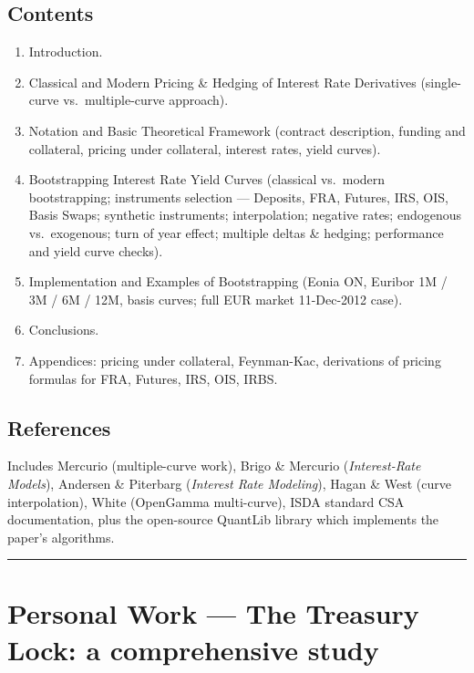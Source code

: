 \documentclass[11pt,a4paper]{article}
\begin{document}
\subsection*{Contents}
\begin{enumerate}[noitemsep]
  \item Introduction.
  \item Classical and Modern Pricing \& Hedging of Interest Rate Derivatives (single-curve vs.\ multiple-curve approach).
  \item Notation and Basic Theoretical Framework (contract description, funding and collateral, pricing under collateral, interest rates, yield curves).
  \item Bootstrapping Interest Rate Yield Curves (classical vs.\ modern bootstrapping; instruments selection --- Deposits, FRA, Futures, IRS, OIS, Basis Swaps; synthetic instruments; interpolation; negative rates; endogenous vs.\ exogenous; turn of year effect; multiple deltas \& hedging; performance and yield curve checks).
  \item Implementation and Examples of Bootstrapping (Eonia ON, Euribor 1M / 3M / 6M / 12M, basis curves; full EUR market 11-Dec-2012 case).
  \item Conclusions.
  \item Appendices: pricing under collateral, Feynman-Kac, derivations of pricing formulas for FRA, Futures, IRS, OIS, IRBS.
\end{enumerate}

\subsection*{References}
Includes Mercurio (multiple-curve work), Brigo \& Mercurio
(\emph{Interest-Rate Models}), Andersen \& Piterbarg (\emph{Interest
Rate Modeling}), Hagan \& West (curve interpolation), White
(OpenGamma multi-curve), ISDA standard CSA documentation, plus
the open-source QuantLib library which implements the paper's
algorithms.

\bigskip\hrule\bigskip

\section{Personal Work --- The Treasury Lock: a comprehensive study}
\label{bib:personal-tlock-comprehensive}
\end{document}
